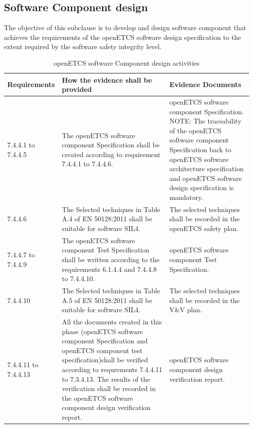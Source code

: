 \documentclass{template/openetcs_report}
\begin{document}
\subsection{Software Component design}
\begin{flushleft}
The objective of this subclause is to develop and design software component that achieves the requirements of the openETCS software design specification to the extent required by the software safety integrity level.
\end{flushleft}
{\footnotesize\sffamily\centering
\begin{longtable}{|p{2cm}|p{9cm}|p{3cm}|}
\caption{openETCS software Component design activities}\\
\hline
\bfseries Requirements & \bfseries How the evidence shall be provided & \bfseries Evidence Documents\\
\hline
\hline
\endhead
\hline
\endfoot

7.4.4.1 to 7.4.4.5 & The openETCS software component Specification shall be created according to requirement 7.4.4.1 to 7.4.4.6. & openETCS software component Specification.
\linebreak
\linebreak
NOTE: \linebreak
The traceability of the openETCS software component Specification back to openETCS software architecture specification and openETCS software design specification is mandatory.\\ 
\hline
7.4.4.6 & The Selected techniques in Table A.4 of EN 50128:2011 shall be suitable for software SIL4.
& The selected techniques shall be recorded in the openETCS safety plan.\\ 
\hline
7.4.4.7 to 7.4.4.9 & The openETCS software component Test Specification shall be written according to the requirements 6.1.4.4 and 7.4.4.8 to 7.4.4.10.
& openETCS software component Test Specification.\\ 
\hline
7.4.4.10 & The Selected techniques in Table A.5 of EN 50128:2011 shall be suitable for software SIL4.
& The selected techniques shall be recorded in the V\&V plan.\\ 
\hline
7.4.4.11 to 7.4.4.13 & All the documents created in this phase (openETCS software component Specification and  openETCS component test specification)shall be verified according to requrements 7.4.4.11 to 7.3.4.13.
The results of the verification shall be recorded in the openETCS software component design verification report. & openETCS software component design verification report.\\ 
\hline
\end{longtable}}
\end{document}

